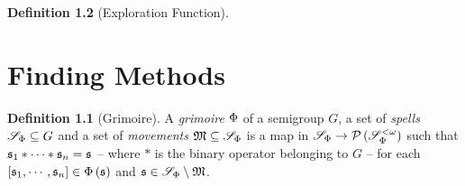 \documentclass[a4paper,twoside,12pt,openany]{report}
\theoremstyle{plain}
\theoremstyle{definition}
\newtheorem{definition}{Definition}
\theoremstyle{remark}
\begin{document}
\begin{definition}[Exploration Function]

\chapter{Finding Methods}

\begin{definition}[Grimoire]
	A \emph{grimoire} \(\Phi\) of a semigroup \(G\), a set of \textit{spells} \(\mathscr{S}_{\Phi}\subseteq G\) and a set of \textit{movements} \(\mathfrak{M}\subseteq \mathscr{S}_{\Phi}\) is a map in \(\mathscr{S}_{\Phi} \to \mathcal{P}\left(\mathscr{S}_{\Phi}^{<\omega}\right)\) such that \(\mathfrak{s}_1*\cdots*\mathfrak{s}_n=\mathfrak{s}\) -- where \(*\) is the binary operator belonging to \(G\) -- for each \(\left[ \mathfrak{s}_1,\cdots,\mathfrak{s}_n \right]\in\Phi\left(\mathfrak{s}\right)\) and \(\mathfrak{s}\in \mathscr{S}_{\Phi}\setminus\mathfrak{M}\).
\end{definition}


\end{definition}
\end{document}

